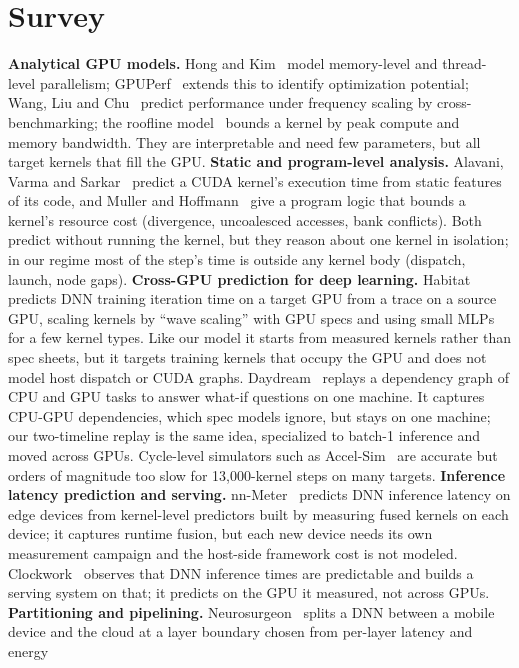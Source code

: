 \documentclass[10pt,twocolumn]{article}
\begin{document}
\section{Survey}
\textbf{Analytical GPU models.} Hong and Kim~\cite{hongkim} model memory-level and
thread-level parallelism; GPUPerf~\cite{gpuperf} extends this to identify optimization
potential; Wang, Liu and Chu~\cite{wang} predict performance under frequency scaling by
cross-benchmarking; the roofline model~\cite{roofline} bounds a kernel by peak compute and
memory bandwidth. They are interpretable and need few parameters, but all target kernels that
fill the GPU.
\textbf{Static and program-level analysis.} Alavani, Varma and Sarkar~\cite{alavani} predict a
CUDA kernel's execution time from static features of its code, and Muller and
Hoffmann~\cite{muller} give a program logic that bounds a kernel's resource cost (divergence,
uncoalesced accesses, bank conflicts). Both predict without running the kernel, but they reason about one kernel in isolation; in
our regime
most of the step's time is outside any kernel body (dispatch, launch, node gaps).
\textbf{Cross-GPU prediction for deep learning.} Habitat~\cite{habitat} predicts DNN
training iteration time on a target GPU from a trace on a source GPU, scaling kernels by
``wave scaling'' with GPU specs and using small MLPs for a few kernel types. Like our model it starts from measured kernels
rather than spec sheets, but it targets
training kernels that occupy the GPU and does not model host dispatch or CUDA graphs.
Daydream~\cite{daydream} replays a dependency graph of CPU and GPU tasks to answer what-if
questions on one machine. It captures CPU-GPU dependencies, which spec models ignore, but
stays on one machine; our two-timeline replay is the same idea, specialized to batch-1
inference and moved across GPUs. Cycle-level simulators such as Accel-Sim~\cite{accelsim}
are accurate but orders of magnitude too slow for 13{,}000-kernel steps on many targets.
\textbf{Inference latency prediction and serving.} nn-Meter~\cite{nnmeter} predicts DNN
inference latency on edge devices from kernel-level predictors built by measuring fused
kernels on each device; it captures runtime fusion, but each new device needs its own
measurement campaign and the host-side framework cost is not modeled. Clockwork~\cite{clockwork}
observes that DNN inference times are predictable and builds a serving system on that; it
predicts on the GPU it measured, not across GPUs.
\textbf{Partitioning and pipelining.} Neurosurgeon~\cite{neurosurgeon} splits a DNN between a
mobile device and the cloud at a layer boundary chosen from per-layer latency and energy
\end{document}
